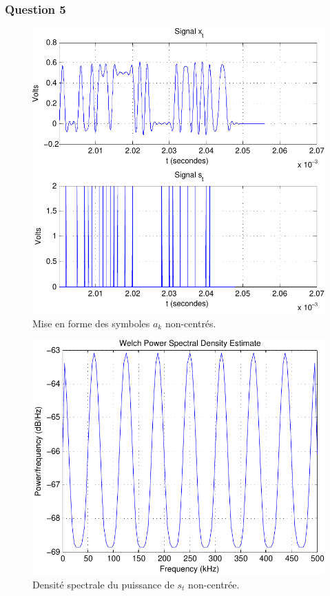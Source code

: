 \documentclass[a4paper,11pt]{article}
\begin{document}
\subsubsection*{Question 5}

\begin{figure}[htb]
	\begin{center}
	\includegraphics[scale=1]{question3_noncentree-crop.pdf}
	\caption{Mise en forme des symboles $a_k$ non-centrés.}
	\label{fig:ques5_q3}
	\end{center}
\end{figure}

\begin{figure}
	\begin{center}
	\includegraphics[scale=1]{welch_s_t_noncentree-crop.pdf}
	\caption{Densité spectrale du puissance de $s_t$ non-centrée.}
	\label{fig:ques5_Q4st}
	\end{center}
\end{figure} 
\end{document}
